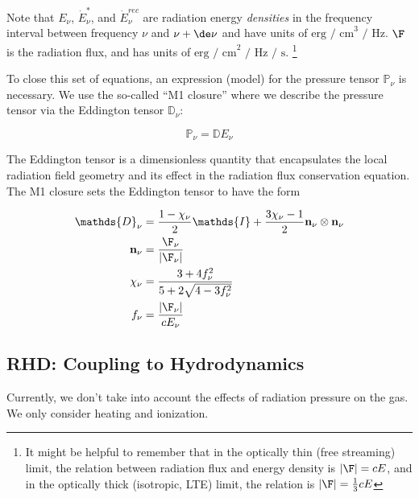 Note that $E_\nu$, $\dot{E}^*_\nu$, and $\dot{E}^{rec}_\nu$ are radiation energy
\emph{densities} in the frequency interval between frequency $\nu$ and $\nu +
\de \nu$ and have units of $\text{erg / cm}^3 \text{ / Hz}$.
$\F$ is the radiation flux, and has units of $\text{erg / cm}^2 \text{ / Hz / s}$.
\footnote{
    It might be helpful to remember that in the optically thin (free streaming)
    limit, the relation between radiation flux and energy density is $|\F| = c
    E$, and in the optically thick (isotropic, LTE) limit, the relation is $|\F|
    = \frac{1}{3}c E$
}


To close this set of equations, an expression (model) for the pressure tensor
$\mathds{P}_\nu$ is necessary.  We use the so-called ``M1 closure'' where we
describe the pressure tensor via the Eddington tensor $\mathds{D}_\nu$:


\begin{equation}
	\mathds{P}_\nu = \mathds{D} E_\nu
\end{equation}

The Eddington tensor is a dimensionless quantity that encapsulates the local
radiation field geometry and its effect in the radiation flux conservation equation.
The M1 closure sets the Eddington tensor to have the form

\begin{align}
	\mathds{D}_\nu &=
        \frac{1- \chi_\nu}{2} \mathds{I} + \frac{3 \chi_\nu - 1}{2} \mathbf{n}_\nu \otimes \mathbf{n}_\nu \label{eq:eddington-freq} \\
	\mathbf{n}_\nu &=
        \frac{\F_\nu}{|\F_\nu|} \\
	\chi_\nu &=
        \frac{3 + 4 f_\nu ^2}{5 + 2 \sqrt{4 - 3 f_\nu^2}} \\
	f_\nu &=
        \frac{|\F_\nu|}{c E_\nu}
\end{align}









\subsection{RHD: Coupling to Hydrodynamics}

Currently, we don't take into account the effects of radiation pressure on the
gas. We only consider heating and ionization.

